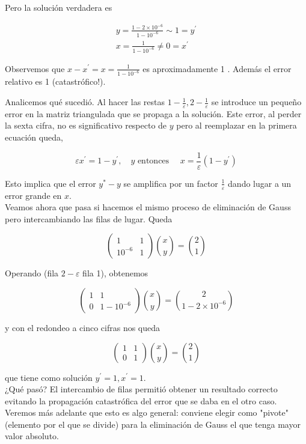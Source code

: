 \documentclass[10pt]{book}
\begin{document}
Pero la solución verdadera es

$$
\begin{gathered}
y=\frac{1-2 \times 10^{-6}}{1-10^{-6}} \sim 1=y^{\prime} \\
x=\frac{1}{1-10^{-6}} \neq 0=x^{\prime}
\end{gathered}
$$

Observemos que $x-x^{\prime}=x=\frac{1}{1-10^{-6}}$ es aproximadamente 1 . Además el error relativo es 1 (catastrófico!).

Analicemos qué sucedió. Al hacer las restas $1-\frac{1}{\varepsilon}, 2-\frac{1}{\varepsilon}$ se introduce un pequeño error en la matriz triangulada que se propaga a la solución. Este error, al perder la sexta cifra, no es significativo respecto de $y$ pero al reemplazar en la primera ecuación queda,

$$
\varepsilon x^{\prime}=1-y^{\prime}, \quad y \text { entonces } \quad x=\frac{1}{\varepsilon}\left(1-y^{\prime}\right)
$$

Esto implica que el error $y^{*}-y$ se amplifica por un factor $\frac{1}{\varepsilon}$ dando lugar a un error grande en $x$.\\
Veamos ahora que pasa si hacemos el mismo proceso de eliminación de Gauss pero intercambiando las filas de lugar. Queda

$$
\left(\begin{array}{cc}
1 & 1 \\
10^{-6} & 1
\end{array}\right)\binom{x}{y}=\binom{2}{1}
$$

Operando (fila $2-\varepsilon$ fila 1), obtenemos

$$
\left(\begin{array}{cc}
1 & 1 \\
0 & 1-10^{-6}
\end{array}\right)\binom{x}{y}=\binom{2}{1-2 \times 10^{-6}}
$$

y con el redondeo a cinco cifras nos queda

$$
\left(\begin{array}{ll}
1 & 1 \\
0 & 1
\end{array}\right)\binom{x}{y}=\binom{2}{1}
$$

que tiene como solución $y^{\prime}=1, x^{\prime}=1$.\\
¿Qué pasó? El intercambio de filas permitió obtener un resultado correcto evitando la propagación catastrófica del error que se daba en el otro caso. Veremos más adelante que esto es algo general: conviene elegir como "pivote" (elemento por el que se divide) para la eliminación de Gauss el que tenga mayor valor absoluto.
\end{document}
